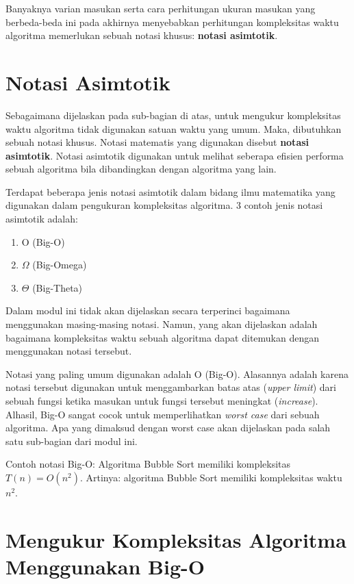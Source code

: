 Banyaknya varian masukan serta cara perhitungan ukuran masukan yang berbeda-beda ini pada akhirnya menyebabkan perhitungan kompleksitas waktu algoritma memerlukan sebuah notasi khusus: \textbf{notasi asimtotik}.

\section{Notasi Asimtotik}

Sebagaimana dijelaskan pada sub-bagian di atas, untuk mengukur kompleksitas waktu algoritma tidak digunakan satuan waktu yang umum. Maka, dibutuhkan sebuah notasi khusus. Notasi matematis yang digunakan disebut \textbf{notasi asimtotik}. Notasi asimtotik digunakan untuk melihat seberapa efisien performa sebuah algoritma bila dibandingkan dengan algoritma yang lain. 

Terdapat beberapa jenis notasi asimtotik dalam bidang ilmu matematika yang digunakan dalam pengukuran kompleksitas algoritma. 3 contoh jenis notasi asimtotik adalah:

\begin{enumerate}
    \item O (Big-O)
    \item $\Omega$ (Big-Omega)
    \item $\Theta$ (Big-Theta)
\end{enumerate}

Dalam modul ini tidak akan dijelaskan secara terperinci bagaimana menggunakan masing-masing notasi. Namun, yang akan dijelaskan adalah bagaimana kompleksitas waktu sebuah algoritma dapat ditemukan dengan menggunakan notasi tersebut.

Notasi yang paling umum digunakan adalah O (Big-O). Alasannya adalah karena notasi tersebut digunakan untuk menggambarkan batas atas (\textit{upper limit}) dari sebuah fungsi ketika masukan untuk fungsi tersebut meningkat (\textit{increase}). Alhasil, Big-O sangat cocok untuk memperlihatkan \textit{worst case} dari sebuah algoritma. Apa yang dimaksud dengan worst case akan dijelaskan pada salah satu sub-bagian dari modul ini.

Contoh notasi Big-O: Algoritma Bubble Sort memiliki kompleksitas $T(n) = O(n^2)$. Artinya: algoritma Bubble Sort memiliki kompleksitas waktu $n^2$. 

\section{Mengukur Kompleksitas Algoritma Menggunakan Big-O}

